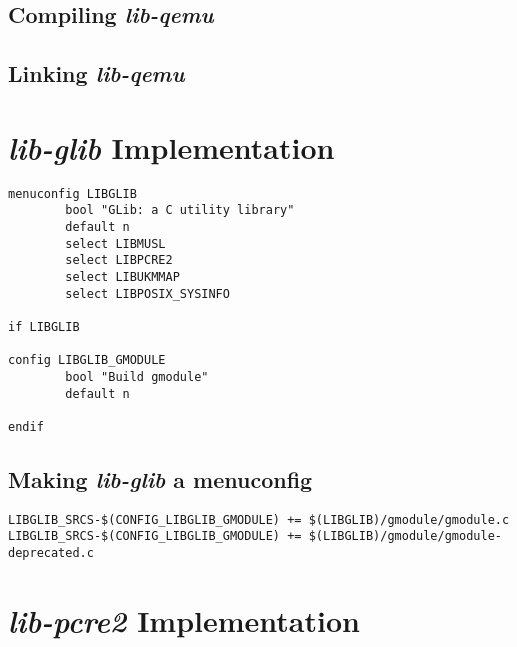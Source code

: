 \subsection{Compiling \textit{lib-qemu}}
\label{subsec:compiling-qemu}

\subsection{Linking \textit{lib-qemu}}
\label{subsec:linking-qemu}

\section{\textit{lib-glib} Implementation}
\label{sec:lib-glib-impl}

\begin{lstlisting}
menuconfig LIBGLIB
        bool "GLib: a C utility library"
        default n
        select LIBMUSL
        select LIBPCRE2
        select LIBUKMMAP
        select LIBPOSIX_SYSINFO

if LIBGLIB

config LIBGLIB_GMODULE
        bool "Build gmodule"
        default n

endif
\end{lstlisting}

\subsection{Making \textit{lib-glib} a menuconfig}
\label{subsec:glib-menuconfig}


\begin{lstlisting}
LIBGLIB_SRCS-$(CONFIG_LIBGLIB_GMODULE) += $(LIBGLIB)/gmodule/gmodule.c
LIBGLIB_SRCS-$(CONFIG_LIBGLIB_GMODULE) += $(LIBGLIB)/gmodule/gmodule-deprecated.c
\end{lstlisting}

\section{\textit{lib-pcre2} Implementation}
\label{sec:lib-pcre2-impl}


